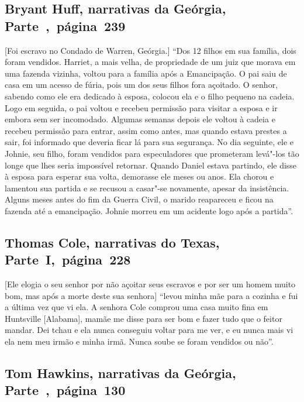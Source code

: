 \subsection{Bryant Huff, narrativas da Geórgia, Parte~,~página~239}
\label{ref152}

{[}Foi escravo no Condado de Warren, Geórgia.{]} ``Dos 12 filhos em sua família, dois foram vendidos. Harriet, a mais
velha, de propriedade de um juiz que morava em uma fazenda vizinha,
voltou para a família após a Emancipação. O pai saiu de casa em um
acesso de fúria, pois um dos seus filhos fora açoitado. O senhor,
sabendo como ele era dedicado à esposa, colocou ela e o filho pequeno na
cadeia. Logo em seguida, o pai voltou e recebeu permissão para visitar a
esposa e ir embora sem ser incomodado. Algumas semanas depois ele voltou
à cadeia e recebeu permissão para entrar, assim como antes, mas quando
estava prestes a sair, foi informado que deveria ficar lá para sua
segurança. No dia seguinte, ele e Johnie, seu filho, foram vendidos para
especuladores que prometeram levá"-los tão longe que lhes seria
impossível retornar. Quando Daniel estava partindo, ele disse à esposa
para esperar sua volta, demorasse ele meses ou anos. Ela chorou e
lamentou sua partida e se recusou a casar"-se novamente, apesar da
insistência. Alguns meses antes do fim da Guerra Civil, o marido
reapareceu e ficou na fazenda até a emancipação. Johnie morreu em um
acidente logo após a partida''.

\subsection{Thomas Cole, narrativas do Texas, Parte~I,~página~228} \label{ref56}

{[}Ele elogia o seu senhor por não açoitar seus escravos e por ser um
homem muito bom, mas após a morte deste sua senhora{]} ``levou minha mãe
para a cozinha e fui a última vez que vi ela. A senhora Cole comprou uma
casa muito fina em Huntsville {[}Alabama{]}, mamãe me disse para ser bom
e fazer tudo que o feitor mandar. Dei tchau e ela nunca conseguiu voltar
para me ver, e eu nunca mais vi ela nem meu irmão e minha irmã. Nunca
soube se foram vendidos ou não''.

\subsection{Tom Hawkins, narrativas da Geórgia, Parte~,~página~130}
\label{ref127}

